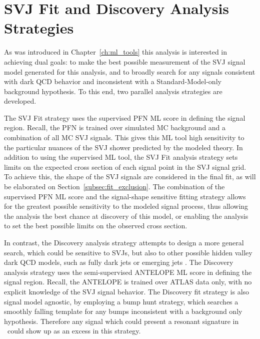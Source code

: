 

\section{SVJ Fit and Discovery Analysis Strategies}
\label{sec:strategies}
As was introduced in Chapter~\ref{ch:ml_tools} this analysis is interested in achieving dual goals: to make the best possible measurement of the SVJ signal model generated for this analysis, and to broadly search for any signals consistent with dark QCD behavior and inconsistent with a Standard-Model-only background hypothesis. To this end, two parallel analysis strategies are developed.\par

The SVJ Fit strategy uses the supervised PFN ML score in defining the signal region. Recall, the PFN is trained over simulated MC background and a combination of all MC SVJ signals. This gives this ML tool high sensitivity to the particular nuances of the SVJ shower predicted by the modeled theory. In addition to using the supervised ML tool, the SVJ Fit analysis strategy sets limits on the expected cross section of each signal point in the SVJ signal grid. To achieve this, the shape of the SVJ signals are considered in the final fit, as will be elaborated on Section~\ref{subsec:fit_exclusion}. The combination of the supervised PFN ML score and the signal-shape sensitive fitting strategy allows for the greatest possible sensitivity to the modeled signal process, thus allowing the analysis the best chance at discovery of this model, or enabling the analysis to set the best possible limits on the observed cross section.\par

In contrast, the Discovery analysis strategy attempts to design a more general search, which could be sensitive to SVJs, but also to other possible hidden valley dark QCD models, such as fully dark jets or emerging jets \cite{snowmass}. The Discovery analysis strategy uses the semi-supervised ANTELOPE ML score in defining the signal region. Recall, the ANTELOPE is trained over ATLAS data only, with no explicit knowledge of the SVJ signal behavior. The Discovery fit strategy is also signal model agnostic, by employing a bump hunt \cite{bumphunt} strategy, which searches a smoothly falling template for any bumps inconsistent with a background only hypothesis. Therefore any signal which could present a resonant signature in \mt~could show up as an excess in this strategy. \par

